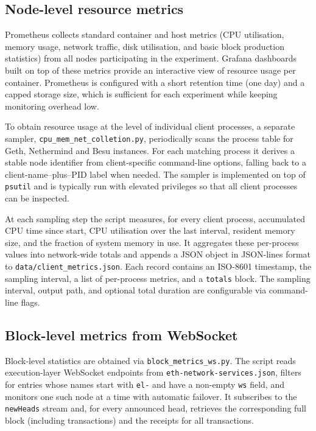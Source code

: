 \subsection{Node-level resource metrics}

Prometheus collects standard container and host metrics (CPU utilisation, memory usage, network traffic, disk utilisation, and basic block production statistics) from all nodes participating in the experiment. Grafana dashboards built on top of these metrics provide an interactive view of resource usage per container. Prometheus is configured with a short retention time (one day) and a capped storage size, which is sufficient for each experiment while keeping monitoring overhead low.

To obtain resource usage at the level of individual client processes, a separate sampler, \texttt{cpu\_mem\_net\_colletion.py}, periodically scans the process table for Geth, Nethermind and Besu instances. For each matching process it derives a stable node identifier from client-specific command-line options, falling back to a client-name--plus--PID label when needed. The sampler is implemented on top of \texttt{psutil} and is typically run with elevated privileges so that all client processes can be inspected.

At each sampling step the script measures, for every client process, accumulated CPU time since start, CPU utilisation over the last interval, resident memory size, and the fraction of system memory in use. It aggregates these per-process values into network-wide totals and appends a JSON object in JSON-lines format to \texttt{data/client\_metrics.json}. Each record contains an ISO-8601 timestamp, the sampling interval, a list of per-process metrics, and a \texttt{totals} block. The sampling interval, output path, and optional total duration are configurable via command-line flags.

\subsection{Block-level metrics from WebSocket}

Block-level statistics are obtained via \texttt{block\_metrics\_ws.py}. The script reads execution-layer WebSocket endpoints from \texttt{eth-network-services.json}, filters for entries whose names start with \texttt{el-} and have a non-empty \texttt{ws} field, and monitors one such node at a time with automatic failover. It subscribes to the \texttt{newHeads} stream and, for every announced head, retrieves the corresponding full block (including transactions) and the receipts for all transactions.

